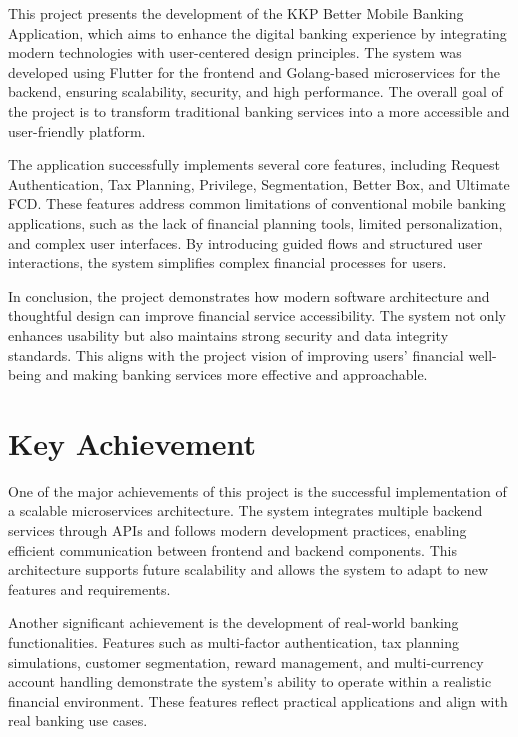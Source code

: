 \documentclass[12pt,oneside,openright,a4paper]{cpe-english-project}
\begin{document}
This project presents the development of the KKP Better Mobile Banking
Application, which aims to enhance the digital banking experience by
integrating modern technologies with user-centered design principles.
The system was developed using Flutter for the frontend and Golang-based
microservices for the backend, ensuring scalability, security, and high
performance. The overall goal of the project is to transform traditional
banking services into a more accessible and user-friendly platform.

The application successfully implements several core features, including
Request Authentication, Tax Planning, Privilege, Segmentation, Better
Box, and Ultimate FCD. These features address common limitations of
conventional mobile banking applications, such as the lack of financial
planning tools, limited personalization, and complex user interfaces. By
introducing guided flows and structured user interactions, the system
simplifies complex financial processes for users.

In conclusion, the project demonstrates how modern software architecture
and thoughtful design can improve financial service accessibility. The
system not only enhances usability but also maintains strong security
and data integrity standards. This aligns with the project vision of
improving users' financial well-being and making banking services more
effective and approachable.

\section{Key Achievement}

One of the major achievements of this project is the successful
implementation of a scalable microservices architecture. The system
integrates multiple backend services through APIs and follows modern
development practices, enabling efficient communication between frontend
and backend components. This architecture supports future scalability
and allows the system to adapt to new features and requirements.

Another significant achievement is the development of real-world banking
functionalities. Features such as multi-factor authentication, tax
planning simulations, customer segmentation, reward management, and
multi-currency account handling demonstrate the system's ability to
operate within a realistic financial environment. These features reflect
practical applications and align with real banking use cases.
\end{document}
